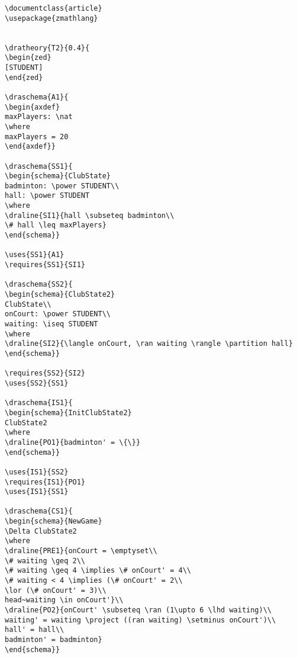 \begin{verbatim}
\documentclass{article}
\usepackage{zmathlang}


\dratheory{T2}{0.4}{
\begin{zed}
[STUDENT]
\end{zed}

\draschema{A1}{
\begin{axdef}
maxPlayers: \nat
\where
maxPlayers = 20
\end{axdef}}

\draschema{SS1}{
\begin{schema}{ClubState}
badminton: \power STUDENT\\
hall: \power STUDENT
\where
\draline{SI1}{hall \subseteq badminton\\
\# hall \leq maxPlayers}
\end{schema}}

\uses{SS1}{A1}
\requires{SS1}{SI1}

\draschema{SS2}{
\begin{schema}{ClubState2}
ClubState\\
onCourt: \power STUDENT\\
waiting: \iseq STUDENT
\where
\draline{SI2}{\langle onCourt, \ran waiting \rangle \partition hall}
\end{schema}}

\requires{SS2}{SI2}
\uses{SS2}{SS1}

\draschema{IS1}{
\begin{schema}{InitClubState2}
ClubState2
\where
\draline{PO1}{badminton' = \{\}}
\end{schema}}

\uses{IS1}{SS2}
\requires{IS1}{PO1}
\uses{IS1}{SS1}

\draschema{CS1}{
\begin{schema}{NewGame}
\Delta ClubState2
\where
\draline{PRE1}{onCourt = \emptyset\\
\# waiting \geq 2\\
\# waiting \geq 4 \implies \# onCourt' = 4\\
\# waiting < 4 \implies (\# onCourt' = 2\\
\lor (\# onCourt' = 3)\\
head~waiting \in onCourt'}\\
\draline{PO2}{onCourt' \subseteq \ran (1\upto 6 \lhd waiting)\\
waiting' = waiting \project ((ran waiting) \setminus onCourt')\\
hall' = hall\\
badminton' = badminton}
\end{schema}}


\end{verbatim}

